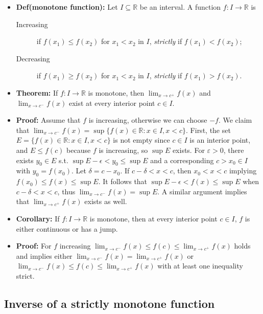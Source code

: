 \documentclass{article}
\begin{document}
\begin{itemize}
\item \textbf{Def(monotone function):} Let $I \subseteq \mathbb{R}$ be an interval. A function $f: I \to \mathbb{R}$ is
\begin{description}
    \item[Increasing] if $f(x_1) \leq f(x_2)$ for $x_1 < x_2$ in $I$, \emph{strictly} if $f(x_1) < f(x_2)$;
    \item[Decreasing] if $f(x_1) \geq f(x_2)$ for $x_1 < x_2$ in $I$, \emph{strictly} if $f(x_1) > f(x_2)$.
\end{description}

\item \textbf{Theorem:} If $f: I \to \mathbb{R}$ is monotone, then $\displaystyle \lim_{x \to c^+} f(x)$ and $\displaystyle \lim_{x \to c^-} f(x)$ exist at every interior point $c \in I$.

\item \textbf{Proof:} Assume that $f$ is increasing, otherwise we can choose $-f$. We claim that $\displaystyle \lim_{x \to c^-} f(x) = \sup\{f(x) \in \mathbb{R}: x \in I, x < c\}$. First, the set $E = \{f(x) \in \mathbb{R}: x \in I, x < c\}$ is not empty since $c \in I$ is an interior point, and $E \leq f(c)$ because $f$ is increasing, so $\sup E$ exists. For $\varepsilon > 0$, there exists $y_0 \in E$ s.t. $\sup E - \epsilon < y_0 \leq \sup E$ and a corresponding $c > x_0 \in I$ with $y_0 = f(x_0)$. Let $\delta = c - x_0$. If $c - \delta < x < c$, then $x_0 < x < c$ implying $f(x_0) \leq f(x) \leq \sup E$. It follows that $\sup E - \epsilon < f(x) \leq \sup E$ when $c - \delta < x < c$, thus $\displaystyle \lim_{x \to c^-} f(x) = \sup E$. A similar argument implies that $\displaystyle \lim_{x \to c^+} f(x)$ exists as well.

\item \textbf{Corollary:} If $f: I \to \mathbb{R}$ is monotone, then at every interior point $c \in I$, $f$ is either continuous or has a jump.

\item \textbf{Proof:} For $f$ increasing $\displaystyle \lim_{x \to c^-} f(x) \leq f(c) \leq \lim_{x \to c^+} f(x)$ holds and implies either $\displaystyle \lim_{x \to c^-} f(x) = \lim_{x \to c^+} f(x)$ or $\displaystyle \lim_{x \to c^-} f(x) \leq f(c) \leq \lim_{x \to c^+} f(x)$ with at least one inequality strict.
\end{itemize}

\subsection{Inverse of a strictly monotone function}
\end{document}
